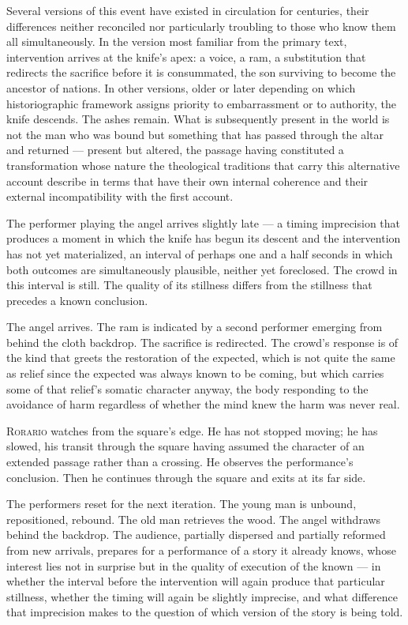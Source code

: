 \documentclass[12pt, oneside]{article}
\newenvironment{action}{%
  \vspace{0.6em}%
  \noindent\ignorespaces%
}{%
  \par\vspace{0.6em}%
}
\begin{document}
\begin{action}
Several versions of this event have existed in circulation for centuries, their differences neither reconciled nor particularly troubling to those who know them all simultaneously. In the version most familiar from the primary text, intervention arrives at the knife's apex: a voice, a ram, a substitution that redirects the sacrifice before it is consummated, the son surviving to become the ancestor of nations. In other versions, older or later depending on which historiographic framework assigns priority to embarrassment or to authority, the knife descends. The ashes remain. What is subsequently present in the world is not the man who was bound but something that has passed through the altar and returned --- present but altered, the passage having constituted a transformation whose nature the theological traditions that carry this alternative account describe in terms that have their own internal coherence and their external incompatibility with the first account.

The performer playing the angel arrives slightly late --- a timing imprecision that produces a moment in which the knife has begun its descent and the intervention has not yet materialized, an interval of perhaps one and a half seconds in which both outcomes are simultaneously plausible, neither yet foreclosed. The crowd in this interval is still. The quality of its stillness differs from the stillness that precedes a known conclusion.

The angel arrives. The ram is indicated by a second performer emerging from behind the cloth backdrop. The sacrifice is redirected. The crowd's response is of the kind that greets the restoration of the expected, which is not quite the same as relief since the expected was always known to be coming, but which carries some of that relief's somatic character anyway, the body responding to the avoidance of harm regardless of whether the mind knew the harm was never real.

\textsc{Rorario} watches from the square's edge. He has not stopped moving; he has slowed, his transit through the square having assumed the character of an extended passage rather than a crossing. He observes the performance's conclusion. Then he continues through the square and exits at its far side.
\end{action}

\begin{action}
The performers reset for the next iteration. The young man is unbound, repositioned, rebound. The old man retrieves the wood. The angel withdraws behind the backdrop. The audience, partially dispersed and partially reformed from new arrivals, prepares for a performance of a story it already knows, whose interest lies not in surprise but in the quality of execution of the known --- in whether the interval before the intervention will again produce that particular stillness, whether the timing will again be slightly imprecise, and what difference that imprecision makes to the question of which version of the story is being told.
\end{action}
\end{document}
